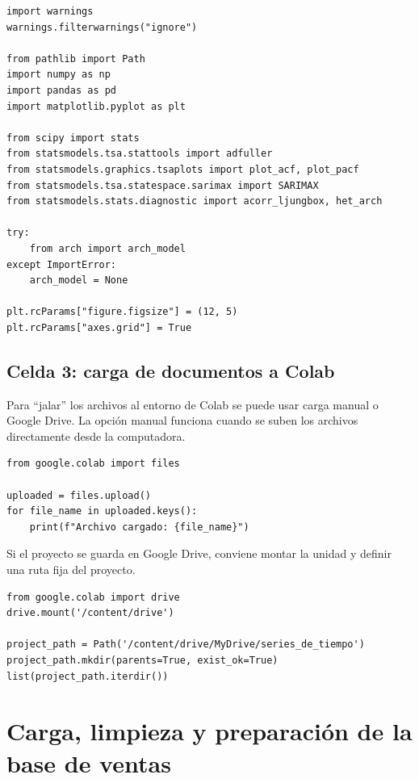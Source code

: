 \documentclass[11pt,letterpaper]{article}
\begin{document}
\begin{lstlisting}[style=pythoncolab]
import warnings
warnings.filterwarnings("ignore")

from pathlib import Path
import numpy as np
import pandas as pd
import matplotlib.pyplot as plt

from scipy import stats
from statsmodels.tsa.stattools import adfuller
from statsmodels.graphics.tsaplots import plot_acf, plot_pacf
from statsmodels.tsa.statespace.sarimax import SARIMAX
from statsmodels.stats.diagnostic import acorr_ljungbox, het_arch

try:
    from arch import arch_model
except ImportError:
    arch_model = None

plt.rcParams["figure.figsize"] = (12, 5)
plt.rcParams["axes.grid"] = True
\end{lstlisting}

\subsection{Celda 3: carga de documentos a Colab}

\begin{markdowncell}
Para ``jalar'' los archivos al entorno de Colab se puede usar carga manual o Google Drive. La opción manual funciona cuando se suben los archivos directamente desde la computadora.
\end{markdowncell}

\begin{lstlisting}[style=pythoncolab]
from google.colab import files

uploaded = files.upload()
for file_name in uploaded.keys():
    print(f"Archivo cargado: {file_name}")
\end{lstlisting}

\begin{markdowncell}
Si el proyecto se guarda en Google Drive, conviene montar la unidad y definir una ruta fija del proyecto.
\end{markdowncell}

\begin{lstlisting}[style=pythoncolab]
from google.colab import drive
drive.mount('/content/drive')

project_path = Path('/content/drive/MyDrive/series_de_tiempo')
project_path.mkdir(parents=True, exist_ok=True)
list(project_path.iterdir())
\end{lstlisting}

\section{Carga, limpieza y preparación de la base de ventas}
\end{document}
